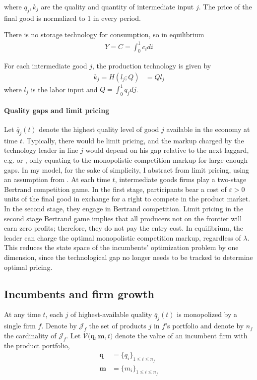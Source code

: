 \documentclass[12pt,english]{article}
\theoremstyle{remark}
\begin{document}
where $q_j,k_j$ are the quality and quantity of intermediate input $j$. The price of the final good is normalized to 1 in every period.

There is no storage technology for consumption, so in equilibrium
\begin{align*}
Y = C = \int_0^1 c_i di
\end{align*}

For each intermediate good $j$, the production technology is given by
\begin{align*}
k_j = H(l_j;Q) &= Q l_j
\end{align*}
where $l_j$ is the labor input and $Q = \int_0^1 q_j dj$. 

\paragraph{Quality gaps and limit pricing} Let $\bar{q}_j(t)$ denote the highest quality level of good $j$ available in the economy at time $t$. Typically, there would be limit pricing, and the markup charged by the technology leader in line $j$ would depend on his gap relative to the next laggard, e.g. \cite{baslandze_spinout_2019} or \cite{aghion_competition_2005}, only equating to the monopolistic competition markup for large enough gaps. In my model, for the sake of simplicity, I abstract from limit pricing, using an assumption from \cite{akcigit_growth_2018}. At each time $t$, intermediate goods firms play a two-stage Bertrand competition game. In the first stage, participants bear a cost of $\varepsilon > 0$ units of the final good in exchange for a right to compete in the product market. In the second stage, they engage in Bertrand competition. Limit pricing in the second stage Bertrand game implies that all producers not on the frontier will earn zero profits; therefore, they do not pay the entry cost. In equilibrium, the leader can charge the optimal monopolistic competition markup, regardless of $\lambda$. This reduces the state space of the incumbents' optimization problem by one dimension, since the technological gap no longer needs to be tracked to determine optimal pricing.

\subsection{Incumbents and firm growth}

At any time $t$, each $j$ of highest-available quality $\bar{q}_j(t)$ is monopolized by a single firm $f$. Denote by $\mathcal{J}_f$ the set of products $j$ in $f$'s portfolio and denote by $n_f$ the cardinality of $\mathcal{J}_f$. Let $\mathcal{V}\Big(\textbf{q},\textbf{m},t\Big)$ denote the value of an incumbent firm with the product portfolio, 
\begin{align*}
\textbf{q} &= \{q_i\}_{1\le i \le n_f} \\
\textbf{m} &= \{m_i\}_{1 \le i \le n_f}
\end{align*} 
\end{document}
